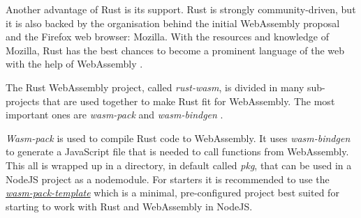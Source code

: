 Another advantage of Rust is its support. Rust is strongly community-driven, but it is also backed by the organisation behind the initial WebAssembly proposal and the Firefox web browser: Mozilla. With the resources and knowledge of Mozilla, Rust has the best chances to become a prominent language of the web with the help of WebAssembly \cite{rust:intro}.

The Rust WebAssembly project, called \textit{rust-wasm}, is divided in many sub-projects that are used together to make Rust fit for WebAssembly. The most important ones are \textit{wasm-pack} and \textit{wasm-bindgen} \cite{rust:wasm}.

\newpage

\textit{Wasm-pack} is used to compile Rust code to WebAssembly. It uses \textit{wasm-bindgen} to generate a JavaScript file that is needed to call functions from WebAssembly. This all is wrapped up in a directory, in default called \textit{pkg}, that can be used in a NodeJS project as a \gls{nodemodule}. For starters it is recommended to use the \textit{ \href{https://github.com/rustwasm/wasm-pack-template}{wasm-pack-template}} which is a minimal, pre-configured project best suited for starting to work with Rust and WebAssembly in NodeJS.

